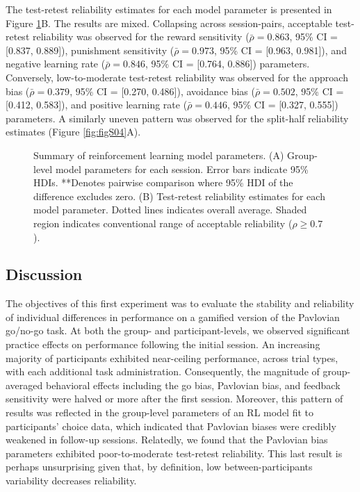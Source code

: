 \documentclass[a4paper,12pt]{article}
\begin{document}
\begin{refsection}[main]
The test-retest reliability estimates for each model parameter is presented in Figure \ref{fig:exp01_modeling}B. The results are mixed. Collapsing across session-pairs, acceptable test-retest reliability was observed for the reward sensitivity ($\bar{\rho} = 0.863$, 95\% CI = [0.837, 0.889]), punishment sensitivity ($\bar{\rho} = 0.973$, 95\% CI = [0.963, 0.981]), and negative learning rate ($\bar{\rho} = 0.846$, 95\% CI = [0.764, 0.886]) parameters. Conversely, low-to-moderate test-retest reliability was observed for the approach bias ($\bar{\rho} = 0.379$, 95\% CI = [0.270, 0.486]), avoidance bias ($\bar{\rho} = 0.502$, 95\% CI = [0.412, 0.583]), and positive learning rate ($\bar{\rho} = 0.446$, 95\% CI = [0.327, 0.555]) parameters. A similarly uneven pattern was observed for the split-half reliability estimates (Figure \ref{fig:figS04}A).

\begin{figure}[ht]
    \centerline{}
    \caption{Summary of reinforcement learning model parameters. (A) Group-level model parameters for each session. Error bars indicate 95\% HDIs. **Denotes pairwise comparison where 95\% HDI of the difference excludes zero. (B) Test-retest reliability estimates for each model parameter. Dotted lines indicates overall average. Shaded region indicates conventional range of acceptable reliability ($\rho \geq 0.7$).}
    \label{fig:exp01_modeling}
\end{figure}

\subsection*{Discussion}

The objectives of this first experiment was to evaluate the stability and reliability of individual differences in performance on a gamified version of the Pavlovian go/no-go task. At both the group- and participant-levels, we observed significant practice effects on performance following the initial session. An increasing majority of participants exhibited near-ceiling performance, across trial types, with each additional task administration. Consequently, the magnitude of group-averaged behavioral effects including the go bias, Pavlovian bias, and feedback sensitivity were halved or more after the first session. Moreover, this pattern of results was reflected in the group-level parameters of an RL model fit to participants' choice data, which indicated that Pavlovian biases were credibly weakened in follow-up sessions. Relatedly, we found that the Pavlovian bias parameters exhibited poor-to-moderate test-retest reliability. This last result is perhaps unsurprising given that, by definition, low between-participants variability decreases reliability.  


\end{refsection}
\end{document}
